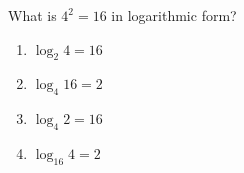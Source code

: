 \bigskip

\item What is $4^2=16$ in logarithmic form?

\begin{enumerate}
\item $\log_2 4=16$
\item $\log_4 16=2$
\item $\log_4 2=16$
\item $\log_{16} 4=2$
\end{enumerate}


